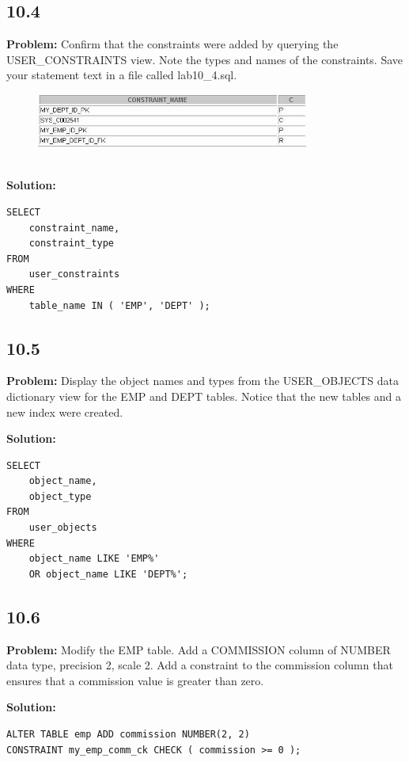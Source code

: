 \documentclass[12pt,a4paper]{article}
\begin{document}
\begin{itemize}
\subsection*{10.4}
\textbf{Problem:} Confirm that the constraints were added by querying the USER\_CONSTRAINTS view. Note the types and names of the constraints. Save your statement text in a file called lab10\_4.sql.
\\
\begin{figure}[htbp]
  \centering
  \includegraphics[width=0.8\textwidth]{Screenshots/104.png}
\end{figure}\\
\textbf{Solution:}
\begin{lstlisting}
SELECT 
    constraint_name,
    constraint_type
FROM
    user_constraints
WHERE
    table_name IN ( 'EMP', 'DEPT' );
\end{lstlisting}

\subsection*{10.5}
\textbf{Problem:} Display the object names and types from the USER\_OBJECTS data dictionary view for the EMP and DEPT tables. Notice that the new tables and a new index were created.

\textbf{Solution:}
\begin{lstlisting}
SELECT 
    object_name,
    object_type
FROM
    user_objects
WHERE
    object_name LIKE 'EMP%'
    OR object_name LIKE 'DEPT%';
\end{lstlisting}

\subsection*{10.6}
\textbf{Problem:} Modify the EMP table. Add a COMMISSION column of NUMBER data type, precision 2, scale 2. Add a constraint to the commission column that ensures that a commission value is greater than zero.

\textbf{Solution:}
\begin{lstlisting}
ALTER TABLE emp ADD commission NUMBER(2, 2) 
CONSTRAINT my_emp_comm_ck CHECK ( commission >= 0 );
\end{lstlisting}


\end{itemize}
\end{document}

